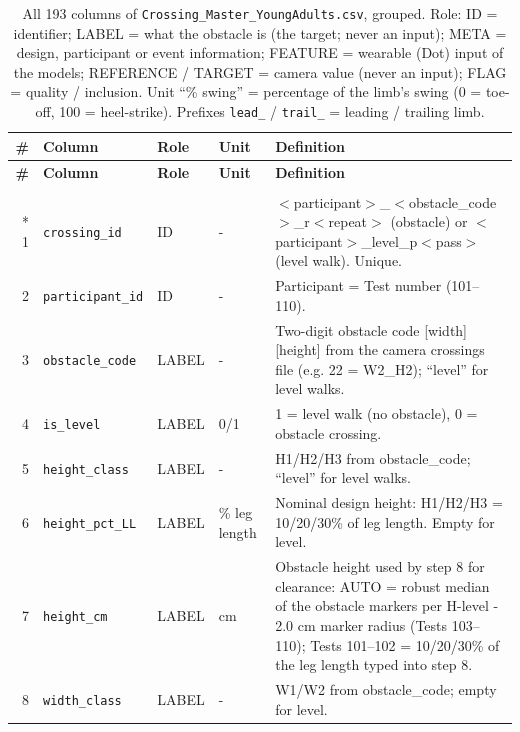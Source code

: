 \begingroup\scriptsize
\setlength{\tabcolsep}{3pt}
\begin{longtable}{@{}r p{3.6cm} p{1.55cm} p{1.15cm} p{8.6cm}@{}}
\caption{All 193 columns of \texttt{Crossing\_Master\_YoungAdults.csv}, grouped. Role: ID = identifier; LABEL = what the obstacle is (the target; never an input); META = design, participant or event information; FEATURE = wearable (Dot) input of the models; REFERENCE / TARGET = camera value (never an input); FLAG = quality / inclusion. Unit ``\% swing'' = percentage of the limb's swing (0 = toe-off, 100 = heel-strike). Prefixes \texttt{lead\_} / \texttt{trail\_} = leading / trailing limb.}\label{tab:variables}\\
\toprule \textbf{\#} & \textbf{Column} & \textbf{Role} & \textbf{Unit} & \textbf{Definition} \\ \midrule \endfirsthead
\toprule \textbf{\#} & \textbf{Column} & \textbf{Role} & \textbf{Unit} & \textbf{Definition} \\ \midrule \endhead
\bottomrule \endfoot
\multicolumn{5}{@{}l}{\textbf{Identifiers and obstacle labels (9)}} \\*
1 & \texttt{crossing\_\allowbreak{}id} & ID & - & $<$participant$>$\_$<$obstacle\_code$>$\_r$<$repeat$>$ (obstacle) or $<$participant$>$\_level\_p$<$pass$>$ (level walk). Unique. \\
2 & \texttt{participant\_\allowbreak{}id} & ID & - & Participant = Test number (101--110). \\
3 & \texttt{obstacle\_\allowbreak{}code} & LABEL & - & Two-digit obstacle code [width][height] from the camera crossings file (e.g. 22 = W2\_H2); ``level'' for level walks. \\
4 & \texttt{is\_\allowbreak{}level} & LABEL & 0/1 & 1 = level walk (no obstacle), 0 = obstacle crossing. \\
5 & \texttt{height\_\allowbreak{}class} & LABEL & - & H1/H2/H3 from obstacle\_code; ``level'' for level walks. \\
6 & \texttt{height\_\allowbreak{}pct\_\allowbreak{}LL} & LABEL & \% leg length & Nominal design height: H1/H2/H3 = 10/20/30\% of leg length. Empty for level. \\
7 & \texttt{height\_\allowbreak{}cm} & LABEL & cm & Obstacle height used by step 8 for clearance: AUTO = robust median of the obstacle markers per H-level - 2.0 cm marker radius (Tests 103--110); Tests 101--102 = 10/20/30\% of the leg length typed into step 8. \\
8 & \texttt{width\_\allowbreak{}class} & LABEL & - & W1/W2 from obstacle\_code; empty for level. \\

\end{longtable}
